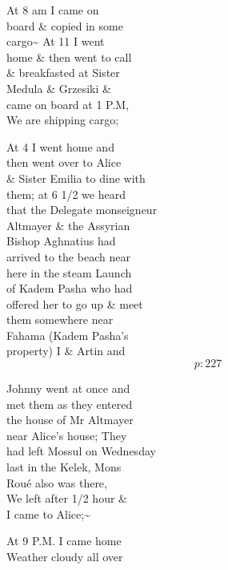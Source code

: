 \documentclass{report}
\begin{document}
	\par{
 	At 8 am I came on\ \\board \& copied in some\ \\cargo\~{} At 11 I went\ \\home \& then went to call\ \\\& breakfasted at Sister\ \\Medula \& Grzesiki \&\ \\came on board at 1 P.M,\ \\We are shipping cargo;\ \\
	}

	\par{
 	At 4 I went home and\ \\then went over to Alice\ \\\& Sister Emilia to dine with\ \\them; at 6 1/2 we heard\ \\that the Delegate monseigneur\ \\Altmayer \& the Assyrian\ \\Bishop Aghnatius had\ \\arrived to the beach near\ \\here in the steam Launch\ \\of Kadem Pasha who had\ \\offered her to go up \& meet\ \\them somewhere near\ \\Fahama (Kadem Pasha's\ \\property) I \& Artin and\ \\
  \[p: 227 \]

	}



	\par{
 	Johnny went at once and\ \\met them as they entered\ \\the house of Mr Altmayer\ \\near Alice's house; They\ \\had left Mossul on Wednesday\ \\last in the Kelek, Mons\ \\Roué also was there,\ \\We left after 1/2 hour \&\ \\I came to Alice;\~{}\ \\
	}

	\par{
 	At 9 P.M. I came home\ \\Weather cloudy all over\ \\
	}
\end{document}
